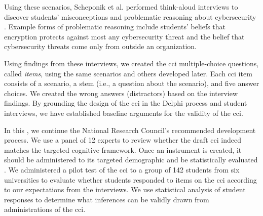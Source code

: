      
     
\begin{table}[!h]     
\centering     
\caption{Five Core Concepts of Cybersecurity}     
\label{tab:topics}     
\end{table}     
     
Using these scenarios, Scheponik et al. \cite{misconceptions} performed think-aloud interviews to discover students' misconceptions and problematic reasoning about cybersecurity \cite{jcerp}. Example forms of problematic reasoning include students' beliefs that encryption protects against most any cybersecurity threat and the belief that cybersecurity threats come only from outside an organization.     
     
Using findings from these interviews, we created the \gls{cci} multiple-choice questions, called \emph{items}, using the same scenarios and others developed later. Each \gls{cci} item consists of a scenario, a stem (i.e., a question about the scenario), and five answer choices. We created the wrong answers (distractors) based on the interview findings. By grounding the design of the \gls{cci} in the Delphi process and student interviews, we have established baseline arguments for the validity of the \gls{cci}.  

In this \NoSpaceDocTitle, we continue the National Research Council's recommended development process. We use a panel of 12 experts to review whether the draft \gls{cci} indeed matches the targeted cognitive framework. Once an instrument is created, it should be administered to its targeted demographic and be statistically evaluated \cite{knowing_what_students_know}. We administered a pilot test of the \gls{cci} to a group of 142 students from six universities to evaluate whether students responded to items on the \gls{cci} according to our expectations from the interviews. We use statistical analysis of student responses to determine what inferences can be validly drawn from administrations of the \gls{cci}.   


